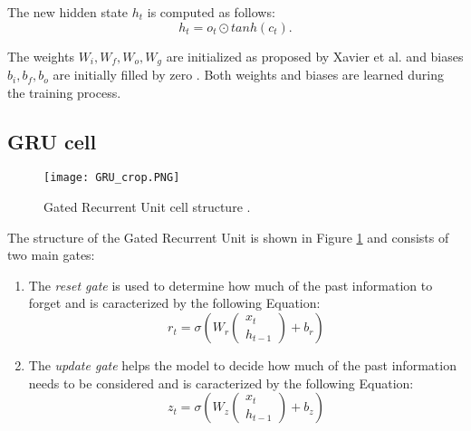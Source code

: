The new hidden state $h_t$ is computed as follows:
\begin{equation}
    h_t = o_t \odot tanh(c_t) .
\end{equation}

The weights $W_i, W_f, W_o, W_g$ are initialized as proposed by Xavier et al. 
\cite{Xavier} and biases $b_i, b_f, b_o$ are initially filled by zero \cite{init}.
Both weights and biases are learned during the training process.





\subsection{GRU cell}

\begin{figure}[hb]
\centerline{\texttt{[image: GRU\_crop.PNG]}}
\caption{Gated Recurrent Unit cell structure \cite{LSTM_GRU_structure}.}
\label{fig:gru}
\end{figure}

The structure of the Gated Recurrent Unit is shown in Figure \ref{fig:gru} 
and consists of two main gates:

\begin{enumerate}
    \item The \textit{reset gate} is used to determine how much of the past 
    information to forget and is caracterized by the following Equation:
        \begin{equation}
            r_t = \sigma \left(
                W_r
                \begin{pmatrix}
                x_t \\
                h_{t-1}
                \end{pmatrix}
                + b_r
            \right)
        \end{equation}
    
    \item The \textit{update gate} helps the model to decide how much of the past 
    information needs to be considered and is caracterized by the following Equation:
        \begin{equation}
            z_t = \sigma \left(
                W_z
                \begin{pmatrix}
                x_t \\
                h_{t-1}
                \end{pmatrix}
                + b_z
            \right)
        \end{equation}

\end{enumerate}

